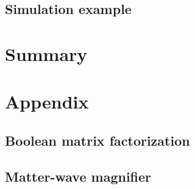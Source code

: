 \documentclass[twoside]{article}
\begin{document}
\subsection{Simulation example}



\newpage
\section{Summary} \label{sec:summary}



\newpage
\section{Appendix} \label{sec:appendix}

\subsection{Boolean matrix factorization} \label{subsec:bmfsat}

\subsection{Matter-wave magnifier} \label{sec:mwm}

%  

\newpage


\end{document}
